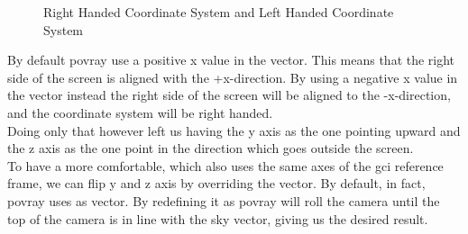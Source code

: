 \begin{figure}[H]
    \centering
        \qquad
        \caption{Right Handed Coordinate System and Left Handed Coordinate System}
    \label{fig:frames}
\end{figure}

By default \acrshort{povray} use a positive x value in the  vector. This means that the right side of the screen is aligned with the +x-direction. By using a negative x value in the  vector instead the right side of the screen will be aligned to the -x-direction, and the coordinate system will be right handed.\\
Doing only that however left us having the y axis as the one pointing upward and the z axis as the one point in the direction which goes outside the screen.\\
To have a more comfortable, which also uses the same axes of the \acrshort{gci} reference frame, we can flip y and z axis by overriding the  vector.
By default, in fact, \acrshort{povray} uses  as  vector. By redefining it as   \acrshort{povray} will roll the camera until the top of the camera is in line with the sky vector, giving us the desired result.

